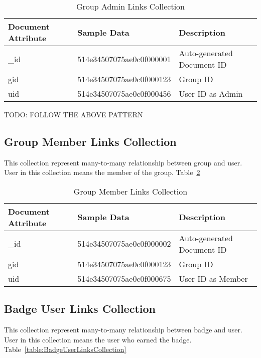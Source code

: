 \begin{table}[H]
\caption{Group Admin Links Collection}\label{table:GroupAdminLinksCollection}
\textbf{ }
\begin{center}
\begin{tabular}{ | l | l |  l | }
\hline
Document Attribute & Sample Data & Description \\ \hline
{\_}id & 514e34507075ae0c0f000001 & Auto-generated Document ID \\ \hline
gid & 514e34507075ae0c0f000123 & Group ID   \\ \hline
uid & 514e34507075ae0c0f000456 & User ID as Admin   \\ \hline
\end{tabular}
\end{center}
\end{table}

TODO: FOLLOW THE ABOVE PATTERN

\subsection{Group Member Links Collection}
This collection represent many-to-many relationship between group and user. User in this collection means the member of the group. Table~\ref{table:GroupMemberLinksCollection}

\begin{table}[H]
\caption{Group Member Links Collection}\label{table:GroupMemberLinksCollection}
\textbf{ }
\begin{center}
\begin{tabular}{ | l | l |  l | }
\hline
Document Attribute & Sample Data & Description \\ \hline
{\_}id & 514e34507075ae0c0f000002 & Auto-generated Document ID \\ \hline
gid & 514e34507075ae0c0f000123 & Group ID   \\ \hline
uid & 514e34507075ae0c0f000675 & User ID as Member   \\ \hline
\end{tabular}
\end{center}
\end{table}


\subsection{Badge User Links Collection}
This collection represent many-to-many relationship between badge and user. User in this collection means the user who earned the badge. Table~\ref{table:BadgeUserLinksCollection}

